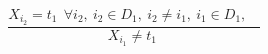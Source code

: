 $$\frac{X_{i_{2}}=t_{1}~~\forall i_{2},~i_{2} \in D_{1},~i_{2} \neq i_{1},~i_{1} \in D_{1},~~~~}{X_{i_{1}} \neq t_{1}~}$$ 